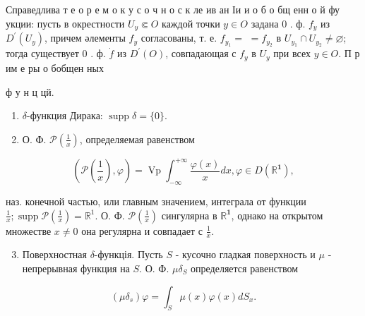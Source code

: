 \documentclass[10pt]{article}
\begin{document}
Справедлива т е о р е м о к у с о ч н о с к ле ив ан Іи и о б о бщ енн о й фу укции: пусть в окрестности $U_{y} \Subset O$ каждой точки $y \in O$ задана 0 . ф. $f_{y}$ из $D^{\prime}\left(U_{y}\right)$, причем әлементы $f_{y}$ согласованы, т. е. $f_{y_{1}}=$ $=f_{y_{2}}$ в $U_{y_{1}} \cap U_{y_{2}} \neq \varnothing$; тогда существует 0 . ф. $\dot{f}$ из $D^{\prime}(O)$, совпадающая с $f_{y}$ в $U_{y}$ при всех $y \in O$. П р им е ры о бобщен ных



ф у н ц цй.



\begin{enumerate}

  \item $\delta$-функция Дирака: $\operatorname{supp} \delta=\{0\}$.



  \item О. Ф. $\mathscr{P}\left(\frac{1}{x}\right)$, определяемая равенством



\end{enumerate}



\[

\left(\mathscr{P}\left(\frac{1}{x}\right), \varphi\right)=\operatorname{Vp} \int_{-\infty}^{+\infty} \frac{\varphi(x)}{x} d x, \varphi \in D\left(\mathbb{R}^{\mathbf{1}}\right),

\]



наз. конечной частью, или главным значением, интеграла от функции $\frac{1}{x} ; \operatorname{supp} \mathscr{P}\left(\frac{1}{x}\right)=\mathbb{R}^{1}$. О. Ф. $\mathscr{P}\left(\frac{1}{x}\right)$ сингулярна в $\mathbb{R}^{\mathbf{1}}$, однако на открытом множестве $x \neq 0$ она регулярна и совпадает с $\frac{1}{x}$.



\begin{enumerate}

  \setcounter{enumi}{2}

  \item Поверхностная $\delta$-функція. Пусть $S$ - кусочно гладкая поверхность и $\mu$ - непрерывная функция на $S$. О. Ф. $\mu \delta_{S}$ определяется равенством

\end{enumerate}



\[

\left(\mu \delta_{s}\right) \varphi=\int_{S} \mu(x) \varphi(x) d S_{x} .

\]
\end{document}
